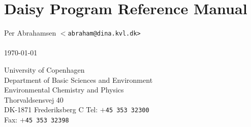 
\chapter*{Daisy Program Reference Manual}

\begin{bf}
  \begin{large}
    Per Abrahamsen \texttt{$<$abraham@dina.kvl.dk>}\\
    \\
    \today{}\\
  \end{large}
\end{bf}
\vfill\noindent
University of Copenhagen\\
Department of Basic Sciences and Environment\\
Environmental Chemistry and Physics\\
Thorvaldsensvej 40\\
DK-1871 Frederiksberg C
Tel: \texttt{$+$45 353 32300}\\
Fax: \texttt{$+$45 353 32398}


